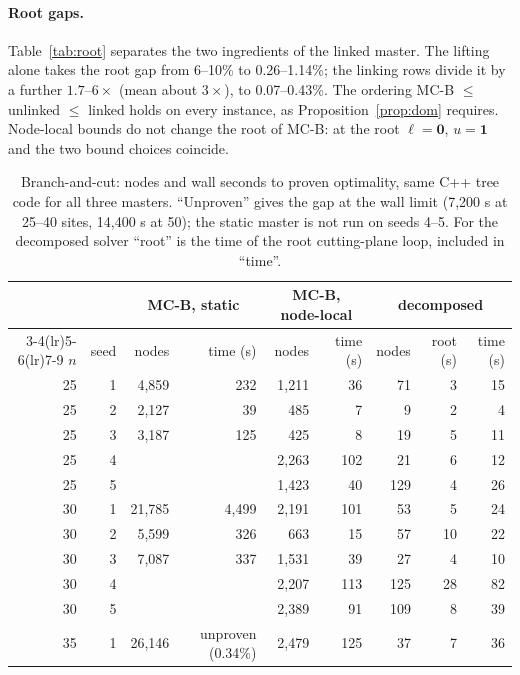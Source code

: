 \documentclass[11pt]{article}
\begin{document}
\paragraph{Root gaps.} Table~\ref{tab:root} separates the two ingredients of the linked master. The lifting alone
takes the root gap from 6--10\% to 0.26--1.14\%; the linking rows divide it by a further $1.7$--$6\times$ (mean about
$3\times$), to 0.07--0.43\%. The ordering \textsc{MC-B} $\le$ unlinked $\le$ linked holds on every instance, as
Proposition~\ref{prop:dom} requires. Node-local bounds do not change the root of \textsc{MC-B}: at the root
$\ell = \mathbf 0$, $u = \mathbf 1$ and the two bound choices coincide.

\begin{table}[ht]
\centering\small
\caption{Branch-and-cut: nodes and wall seconds to proven optimality, same C++ tree code for all three masters.
``Unproven'' gives the gap at the wall limit (7,200 s at 25--40 sites, 14,400 s at 50); the static master is not run on
seeds 4--5. For the decomposed solver ``root'' is the time of the root cutting-plane loop, included in ``time''.}
\label{tab:main}
\begin{tabular}{rr rr rr rrr}
\toprule
& & \multicolumn{2}{c}{\textsc{MC-B}, static} & \multicolumn{2}{c}{\textsc{MC-B}, node-local} & \multicolumn{3}{c}{decomposed}\\
\cmidrule(lr){3-4}\cmidrule(lr){5-6}\cmidrule(lr){7-9}
$n$ & seed & nodes & time (s) & nodes & time (s) & nodes & root (s) & time (s)\\
\midrule
25 & 1 & 4,859 & 232 & 1,211 & 36 & 71 & 3 & 15\\
25 & 2 & 2,127 & 39 & 485 & 7 & 9 & 2 & 4\\
25 & 3 & 3,187 & 125 & 425 & 8 & 19 & 5 & 11\\
25 & 4 &  &  & 2,263 & 102 & 21 & 6 & 12\\
25 & 5 &  &  & 1,423 & 40 & 129 & 4 & 26\\
30 & 1 & 21,785 & 4,499 & 2,191 & 101 & 53 & 5 & 24\\
30 & 2 & 5,599 & 326 & 663 & 15 & 57 & 10 & 22\\
30 & 3 & 7,087 & 337 & 1,531 & 39 & 27 & 4 & 10\\
30 & 4 &  &  & 2,207 & 113 & 125 & 28 & 82\\
30 & 5 &  &  & 2,389 & 91 & 109 & 8 & 39\\
35 & 1 & 26,146 & unproven (0.34\%) & 2,479 & 125 & 37 & 7 & 36\\

\end{tabular}
\end{table}
\end{document}
